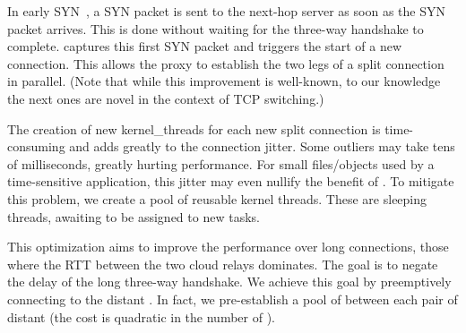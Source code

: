 


 In early SYN~\cite{ladiwala,siracusano2016miniproxy}, a SYN packet is sent to the next-hop server as soon as the SYN packet arrives. This is done without waiting for the three-way handshake to complete. \oursys captures this first SYN packet and triggers the start of a new connection. This allows the proxy to establish the two legs of a split connection in parallel. (Note that while this improvement is well-known, to our knowledge the next ones are novel in the context of TCP switching.)

The creation of new kernel\_threads for each new split connection is time-consuming and adds greatly to the connection jitter. Some outliers may take tens of milliseconds, greatly hurting performance. For small files/objects used by a time-sensitive application, this jitter may even nullify the benefit of \oursys. To mitigate this problem, we create a pool of reusable kernel threads. These are sleeping threads, awaiting to be assigned to new tasks.

  This optimization aims to improve the performance over long connections, \ie those where the RTT between the two cloud relays dominates. The goal is to negate the delay of the long three-way handshake. We achieve this goal by preemptively connecting to the distant \proxies. In fact, we pre-establish a pool of \reconn between each pair of distant \proxies (the cost is quadratic in the number of \proxies).


